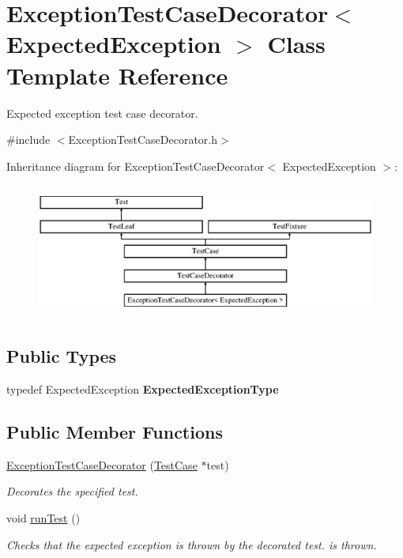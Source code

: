 \hypertarget{class_exception_test_case_decorator}{}\section{Exception\+Test\+Case\+Decorator$<$ Expected\+Exception $>$ Class Template Reference}
\label{class_exception_test_case_decorator}


Expected exception test case decorator.  




{\ttfamily \#include $<$Exception\+Test\+Case\+Decorator.\+h$>$}

Inheritance diagram for Exception\+Test\+Case\+Decorator$<$ Expected\+Exception $>$\+:\begin{figure}[H]
\begin{center}
\leavevmode
\includegraphics[height=4.444445cm]{class_exception_test_case_decorator}
\end{center}
\end{figure}
\subsection*{Public Types}
\begin{DoxyCompactItemize}
\item 
typedef Expected\+Exception {\bfseries Expected\+Exception\+Type}\hypertarget{class_exception_test_case_decorator_a3fc7e11a4aa1730fa98ff6ac52958ae9}{}\label{class_exception_test_case_decorator_a3fc7e11a4aa1730fa98ff6ac52958ae9}

\end{DoxyCompactItemize}
\subsection*{Public Member Functions}
\begin{DoxyCompactItemize}
\item 
\hyperlink{class_exception_test_case_decorator_a01b0c42952450cff574dd9e293c718fa}{Exception\+Test\+Case\+Decorator} (\hyperlink{class_test_case}{Test\+Case} $\ast$test)
\begin{DoxyCompactList}\small\item\em Decorates the specified test. \end{DoxyCompactList}\item 
void \hyperlink{class_exception_test_case_decorator_a3f78294d459a94f55413162d814f291d}{run\+Test} ()
\begin{DoxyCompactList}\small\item\em Checks that the expected exception is thrown by the decorated test. is thrown. \end{DoxyCompactList}\end{DoxyCompactItemize}
